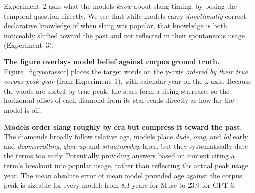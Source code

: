 \documentclass[11pt]{article}
\begin{document}
Experiment~2 asks what the models \textit{know} about slang timing, by posing the temporal question directly. We see that while models carry \emph{directionally} correct declarative knowledge of when slang was popular, that knowledge is both noticeably shifted toward the past and not reflected in their spontaneous usage (Experiment~3).

\textbf{The figure overlays model belief against corpus ground truth.} Figure~\ref{fig:yearassoc} places the target words on the y-axis \emph{ordered by their true corpus peak year} (from Experiment~1), with calendar year on the x-axis. Because the words are sorted by true peak, the stars form a rising staircase, so the horizontal offset of each diamond from its star reads directly as how far the model is off.

\textbf{Models order slang roughly by era but compress it toward the past.} The diamonds broadly follow relative age, models place \textit{dude}, \textit{omg}, and \textit{lol} early and \textit{doomscrolling}, \textit{glow-up} and \textit{situationship} later, but they systematically date the terms too early. Potentially providing answers based on content citing a term's breakout into popular usage, rather than reflecting the actual peak usage year. The mean absolute error of mean model provided age against the corpus peak is sizeable for every model: from 8.3 years for Muse to 23.9 for GPT-6.
\end{document}
